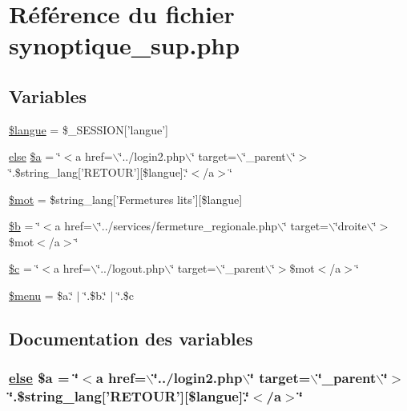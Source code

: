 \hypertarget{synoptique__sup_8php}{
\section{R\'{e}f\'{e}rence du fichier synoptique\_\-sup.php}
\label{synoptique__sup_8php}
}
\subsection*{Variables}
\begin{CompactItemize}
\item 
\hyperlink{synoptique__sup_8php_a0}{\$langue} = \$\_\-SESSION\mbox{[}'langue'\mbox{]}
\item 
\hyperlink{cron_8php_a9}{else} \hyperlink{synoptique__sup_8php_a1}{\$a} = \char`\"{}$<$a href=$\backslash$\char`\"{}../login2.php$\backslash$\char`\"{} target=$\backslash$\char`\"{}\_\-parent$\backslash$\char`\"{}$>$\char`\"{}.\$string\_\-lang\mbox{[}'RETOUR'\mbox{]}\mbox{[}\$langue\mbox{]}.\char`\"{}$<$/a$>$\char`\"{}
\item 
\hyperlink{synoptique__sup_8php_a2}{\$mot} = \$string\_\-lang\mbox{[}'Fermetures lits'\mbox{]}\mbox{[}\$langue\mbox{]}
\item 
\hyperlink{synoptique__sup_8php_a3}{\$b} = \char`\"{}$<$a href=$\backslash$\char`\"{}../services/fermeture\_\-regionale.php$\backslash$\char`\"{} target=$\backslash$\char`\"{}droite$\backslash$\char`\"{}$>$\$mot$<$/a$>$\char`\"{}
\item 
\hyperlink{synoptique__sup_8php_a4}{\$c} = \char`\"{}$<$a href=$\backslash$\char`\"{}../logout.php$\backslash$\char`\"{} target=$\backslash$\char`\"{}\_\-parent$\backslash$\char`\"{}$>$\$mot$<$/a$>$\char`\"{}
\item 
\hyperlink{synoptique__sup_8php_a5}{\$menu} = \$a.\char`\"{} $|$ \char`\"{}.\$b.\char`\"{} $|$ \char`\"{}.\$c
\end{CompactItemize}


\subsection{Documentation des variables}
\hypertarget{synoptique__sup_8php_a1}{
\subsubsection[\$a]{\setlength{\rightskip}{0pt plus 5cm}\hyperlink{cron_8php_a9}{else} \$a = \char`\"{}$<$a href=$\backslash$\char`\"{}../login2.php$\backslash$\char`\"{} target=$\backslash$\char`\"{}\_\-parent$\backslash$\char`\"{}$>$\char`\"{}.\$string\_\-lang\mbox{[}'RETOUR'\mbox{]}\mbox{[}\$langue\mbox{]}.\char`\"{}$<$/a$>$\char`\"{}}}
\label{synoptique__sup_8php_a1}


